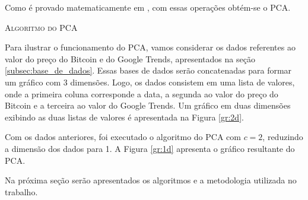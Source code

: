 Como é provado matematicamente em \cite{Jolliffe}, com essas operações obtém-se o PCA. 

\begin{center}
 \begin{algorithm}[H]
   \SetAlgoLined
   \label{alg:PCA1}
   \caption{\textsc{Algoritmo do PCA }}
 \end{algorithm}
\end{center}

Para ilustrar o funcionamento do PCA, vamos considerar os dados referentes ao valor do preço do Bitcoin e do Google Trends, apresentados na seção \ref{subsec:base_de_dados}. Essas bases de dados serão concatenadas para formar um gráfico com 3 dimensões. Logo, os dados consistem em uma lista de valores, onde a primeira coluna corresponde a data, a segunda ao valor do preço do Bitcoin e a terceira ao valor do Google Trends. Um gráfico em duas dimensões exibindo as duas listas de valores é apresentada na Figura \ref{gr:2d}. 

Com os dados anteriores, foi executado o algoritmo do PCA com $c=2$, reduzindo a dimensão dos dados para 1. A Figura \ref{gr:1d} apresenta o gráfico resultante do PCA.

Na próxima seção serão apresentados os algoritmos e a metodologia utilizada no trabalho. 

